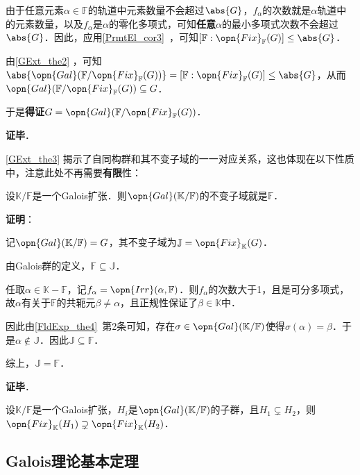 由于任意元素$\alpha\in\mathbb{F}$的轨道中元素数量不会超过$\abs{G}$，$f_\alpha$的次数就是$\alpha$轨道中的元素数量，以及$f_\alpha$是$\alpha$的零化多项式，可知\textbf{任意}$\alpha$的最小多项式次数不会超过$\abs{G}$．因此，应用\autoref{PrmtEl_cor3}~，可知$[\mathbb{F}:\opn{Fix}_\mathbb{F}(G)]\leq \abs{G}$．

由\autoref{GExt_the2} ，可知$\abs{\opn{Gal}(\mathbb{F}/\opn{Fix}_\mathbb{F}(G))}=[\mathbb{F}:\opn{Fix}_\mathbb{F}(G)]\leq\abs{G}$，从而$\opn{Gal}(\mathbb{F}/\opn{Fix}_\mathbb{F}(G))\subseteq G$．

于是\textbf{得证}$G = \opn{Gal}(\mathbb{F}/\opn{Fix}_\mathbb{F}(G))$．

\textbf{证毕}．


\autoref{GExt_the3} 揭示了自同构群和其不变子域的一一对应关系，这也体现在以下性质中，注意此处不再需要\textbf{有限}性：



\begin{theorem}{}
设$\mathbb{K}/\mathbb{F}$是一个Galois扩张．则$\opn{Gal}(\mathbb{K}/\mathbb{F})$的不变子域就是$\mathbb{F}$．
\end{theorem}

\textbf{证明}：

记$\opn{Gal}(\mathbb{K}/\mathbb{F})=G$，其不变子域为$\mathbb{J}=\opn{Fix}_\mathbb{K}(G)$．

由Galois群的定义，$\mathbb{F}\subseteq\mathbb{J}$．

任取$\alpha\in\mathbb{K}-\mathbb{F}$，记$f_\alpha=\opn{Irr}(\alpha, \mathbb{F})$．则$f_\alpha$的次数大于1，且是可分多项式，故$\alpha$有关于$\mathbb{F}$的共轭元$\beta\neq \alpha$，且正规性保证了$\beta\in\mathbb{K}$中．

因此由\autoref{FldExp_the4}~第2条可知，存在$\sigma\in\opn{Gal}(\mathbb{K}/\mathbb{F})$使得$\sigma(\alpha)=\beta$．于是$\alpha\not\in \mathbb{J}$．因此$\mathbb{J}\subseteq\mathbb{F}$．

综上，$\mathbb{J}=\mathbb{F}$．

\textbf{证毕}．


\begin{corollary}{}
设$\mathbb{K}/\mathbb{F}$是一个Galois扩张，$H_i$是$\opn{Gal}(\mathbb{K}/\mathbb{F})$的子群，且$H_1\subsetneq H_2$，则$\opn{Fix}_\mathbb{K}(H_1)\supsetneq \opn{Fix}_\mathbb{K}(H_2)$．
\end{corollary}






\subsection{Galois理论基本定理}

